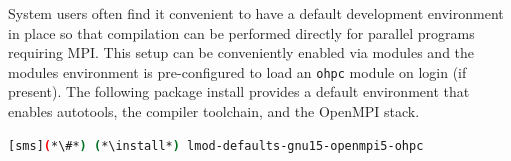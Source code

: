 System users often find it convenient to have a default development environment
in place so that compilation can be performed directly for parallel programs
requiring MPI. This setup can be conveniently enabled via modules and the \OHPC{}
modules environment is pre-configured to load an \texttt{ohpc} module on login
(if present). The following package install provides a default
environment that enables autotools, the \GNU{} compiler toolchain, and the
OpenMPI stack.

\begin{lstlisting}[language=bash]
[sms](*\#*) (*\install*) lmod-defaults-gnu15-openmpi5-ohpc
\end{lstlisting}
